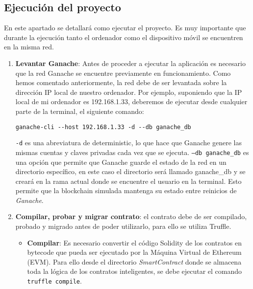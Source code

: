 \subsection{Ejecución del proyecto}

En este apartado se detallará como ejecutar el proyecto. Es muy importante que durante la ejecución tanto el ordenador como el dispositivo móvil se encuentren en la misma red.

\begin{enumerate}

\item \textbf{Levantar Ganache}: Antes de proceder a ejecutar la aplicación es necesario que la red Ganache se encuentre previamente en funcionamiento.
Como hemos comentado anteriormente, la red debe de ser levantada sobre la dirección IP local de nuestro ordenador. Por ejemplo, suponiendo que la IP local de mi ordenador es 192.168.1.33, deberemos de ejecutar desde cualquier parte de la terminal, el siguiente comando: 
\begin{verbatim}
ganache-cli --host 192.168.1.33 -d --db ganache_db
\end{verbatim}

\texttt{-d} es una abreviatura de deterministic, lo que hace que Ganache genere las mismas cuentas y claves privadas cada vez que se ejecuta.
\texttt{--db ganache\_db} es una opción que permite que Ganache guarde el estado de la red en un directorio específico, en este caso el directorio será llamado ganache\_db y se creará en la rama actual donde se encuentre el usuario en la terminal.
Esto permite que la blockchain simulada mantenga su estado entre reinicios de \textit{Ganache}.


\item \textbf{Compilar, probar y migrar contrato}: el contrato debe de ser compilado, probado y migrado antes de poder utilizarlo, para ello se utiliza Truffle.

	\begin{itemize}
	\item \textbf{Compilar}: Es necesario convertir el código Solidity de los contratos en bytecode que pueda
	ser ejecutado por la Máquina Virtual de Ethereum (EVM).
	Para ello desde el directorio \textit{SmartContract} donde se almacena toda la lógica de los contratos
	inteligentes, se debe ejecutar el comando \texttt{truffle compile}.
	
	\end{itemize}
	

\end{enumerate}
